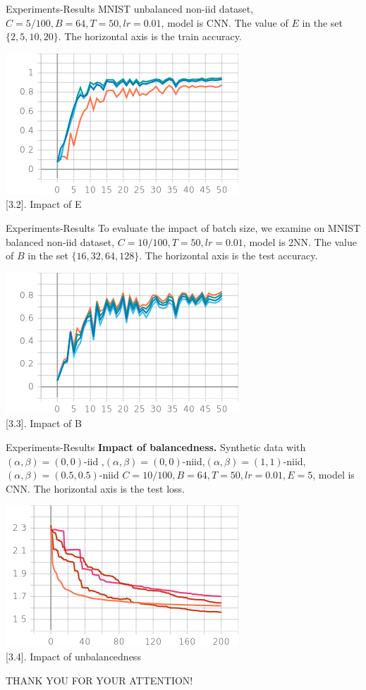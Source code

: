 \documentclass{beamer}
\begin{document}
\begin{frame}{Experiments-Results}
 MNIST unbalanced non-iid dataset, $C=5/100, B=64, T=50,lr=0.01$, model is CNN. The value of $E$ in the set $\{2,5,10,20\}$. The horizontal axis is the train accuracy.
\begin{center}
	\includegraphics[scale=0.65]{E.png}\\
	\figurename[3.2]{. Impact of E}
\end{center}
\end{frame}
\begin{frame}{Experiments-Results}
To evaluate the impact of batch size, we examine on MNIST balanced non-iid dataset, $C=10/100, T=50,lr=0.01$, model is 2NN. The value of $B$ in the set $\{16,32,64,128\}$. The horizontal axis is the test accuracy.
\begin{center}
	\includegraphics[scale=0.65]{B.png}\\
	\figurename[3.3]{. Impact of B}
\end{center}
\end{frame}
\begin{frame}{Experiments-Results}
\textbf{Impact of balancedness.}
	  Synthetic data with $(\alpha, \beta) =(0,0)$-iid ,$(\alpha, \beta) =(0,0)$-niid,$(\alpha, \beta) =(1,1)$-niid,$(\alpha, \beta) =(0.5,0.5)$-niid $C=10/100, B=64, T=50,lr=0.01, E=5$, model is CNN. The horizontal axis is the test loss.
\begin{center}
	\includegraphics[scale=0.65]{syn.png}\\
	\figurename[3.4]{. Impact of unbalancedness}
\end{center}
\end{frame}

\begin{frame}

THANK YOU FOR YOUR ATTENTION!
\end{frame}
\end{document}
